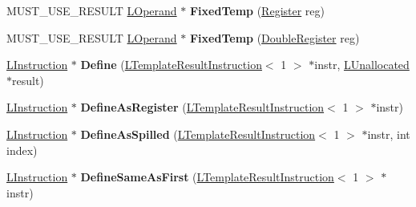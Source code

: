 \begin{DoxyCompactItemize}
\item 
M\+U\+S\+T\+\_\+\+U\+S\+E\+\_\+\+R\+E\+S\+U\+LT \hyperlink{classv8_1_1internal_1_1_l_operand}{L\+Operand} $\ast$ {\bfseries Fixed\+Temp} (\hyperlink{structv8_1_1internal_1_1_register}{Register} reg)\hypertarget{classv8_1_1internal_1_1_l_chunk_builder_a0e9a78fbc1b87c8a44c721e93143b26e}{}\label{classv8_1_1internal_1_1_l_chunk_builder_a0e9a78fbc1b87c8a44c721e93143b26e}

\item 
M\+U\+S\+T\+\_\+\+U\+S\+E\+\_\+\+R\+E\+S\+U\+LT \hyperlink{classv8_1_1internal_1_1_l_operand}{L\+Operand} $\ast$ {\bfseries Fixed\+Temp} (\hyperlink{structv8_1_1internal_1_1_double_register}{Double\+Register} reg)\hypertarget{classv8_1_1internal_1_1_l_chunk_builder_adab20084d9ddf5e0e2c369ada7049b2e}{}\label{classv8_1_1internal_1_1_l_chunk_builder_adab20084d9ddf5e0e2c369ada7049b2e}

\item 
\hyperlink{classv8_1_1internal_1_1_l_instruction}{L\+Instruction} $\ast$ {\bfseries Define} (\hyperlink{classv8_1_1internal_1_1_l_template_result_instruction}{L\+Template\+Result\+Instruction}$<$ 1 $>$ $\ast$instr, \hyperlink{classv8_1_1internal_1_1_l_unallocated}{L\+Unallocated} $\ast$result)\hypertarget{classv8_1_1internal_1_1_l_chunk_builder_afd009a30c72fe37dd1b35d4241854ca0}{}\label{classv8_1_1internal_1_1_l_chunk_builder_afd009a30c72fe37dd1b35d4241854ca0}

\item 
\hyperlink{classv8_1_1internal_1_1_l_instruction}{L\+Instruction} $\ast$ {\bfseries Define\+As\+Register} (\hyperlink{classv8_1_1internal_1_1_l_template_result_instruction}{L\+Template\+Result\+Instruction}$<$ 1 $>$ $\ast$instr)\hypertarget{classv8_1_1internal_1_1_l_chunk_builder_af4f9a5078553b1f743899df249a25b31}{}\label{classv8_1_1internal_1_1_l_chunk_builder_af4f9a5078553b1f743899df249a25b31}

\item 
\hyperlink{classv8_1_1internal_1_1_l_instruction}{L\+Instruction} $\ast$ {\bfseries Define\+As\+Spilled} (\hyperlink{classv8_1_1internal_1_1_l_template_result_instruction}{L\+Template\+Result\+Instruction}$<$ 1 $>$ $\ast$instr, int index)\hypertarget{classv8_1_1internal_1_1_l_chunk_builder_a4e42c6b4bb935cc879f078e349ee6a1d}{}\label{classv8_1_1internal_1_1_l_chunk_builder_a4e42c6b4bb935cc879f078e349ee6a1d}

\item 
\hyperlink{classv8_1_1internal_1_1_l_instruction}{L\+Instruction} $\ast$ {\bfseries Define\+Same\+As\+First} (\hyperlink{classv8_1_1internal_1_1_l_template_result_instruction}{L\+Template\+Result\+Instruction}$<$ 1 $>$ $\ast$instr)\hypertarget{classv8_1_1internal_1_1_l_chunk_builder_a7a3e6bb64466e8d0b7062311bc13455a}{}\label{classv8_1_1internal_1_1_l_chunk_builder_a7a3e6bb64466e8d0b7062311bc13455a}


\end{DoxyCompactItemize}
